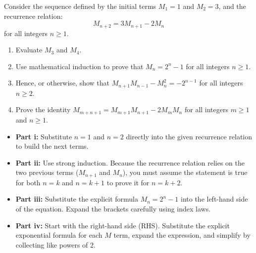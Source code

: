 \begin{problem}
Consider the sequence defined by the initial terms $M_1 = 1$ and $M_2 = 3$, and the recurrence relation:
\[
M_{n+2} = 3M_{n+1} - 2M_n
\]
for all integers $n \ge 1$.

\begin{enumerate}[label=\roman*., leftmargin=*]
    \item Evaluate $M_3$ and $M_4$.
    \item Use mathematical induction to prove that $M_n = 2^n - 1$ for all integers $n \ge 1$.
    \item Hence, or otherwise, show that $M_{n+1}M_{n-1} - M_n^2 = -2^{n-1}$ for all integers $n \ge 2$.
    \item Prove the identity $M_{m+n+1} = M_{m+1}M_{n+1} - 2M_m M_n$ for all integers $m \ge 1$ and $n \ge 1$.
\end{enumerate}
\end{problem}

\begin{hint}
\begin{itemize}[leftmargin=*]
    \item \textbf{Part i:} Substitute $n=1$ and $n=2$ directly into the given recurrence relation to build the next terms.
    \item \textbf{Part ii:} Use strong induction. Because the recurrence relation relies on the two previous terms ($M_{n+1}$ and $M_n$), you must assume the statement is true for both $n=k$ and $n=k+1$ to prove it for $n=k+2$.
    \item \textbf{Part iii:} Substitute the explicit formula $M_n = 2^n - 1$ into the left-hand side of the equation. Expand the brackets carefully using index laws.
    \item \textbf{Part iv:} Start with the right-hand side (RHS). Substitute the explicit exponential formula for each $M$ term, expand the expression, and simplify by collecting like powers of 2.
\end{itemize}
\end{hint}

